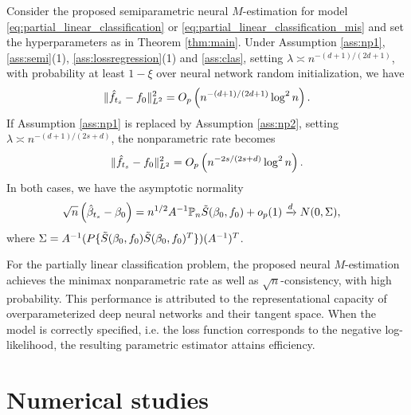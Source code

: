\begin{theorem}\label{cor:classi}
Consider the proposed semiparametric neural $M$-estimation for model \eqref{eq:partial_linear_classification} or \eqref{eq:partial_linear_classification_mis} and set the hyperparameters as in Theorem \ref{thm:main}. Under Assumption \ref{ass:np1}, \ref{ass:semi}(1), \ref{ass:lossregression}(1) and \ref{ass:clas}, 
setting $\lambda \asymp n^{-(d+1)/(2d+1)}$, with probability at least $1-\xi$ over neural network random initialization, 
we have 
$$
\| \hat{f}_{t_{s}} - f_{0} \|_{L^2}^2 = O_p\left( n^{-(d+1)/(2d+1)} \log^2 n \right).
$$
If Assumption \ref{ass:np1} is replaced by Assumption \ref{ass:np2}, setting $\lambda \asymp n^{-(d+1)/(2s+d)}$, the nonparametric rate becomes 
$$
    \| \hat{f}_{t_{s}} - f_{0} \|_{L^2}^2 = O_p\left( n^{-2s/(2s+d)} \log^2 n \right).
$$ 
In both cases, we have the asymptotic normality
\begin{equation}\label{equ:normal2}
\begin{aligned}
&\sqrt{n}\left(\hat{\beta}_{t_{s}}-\beta_{0}\right)=
n^{1/2}  A^{-1}  \mathbb{P}_{n} \tilde{S}(\beta_{0}, f_{0}) +o_p(1) 
\xrightarrow{d} N(0, \Sigma), 
\end{aligned}
\end{equation}
where $\Sigma=A^{-1} (P \{ \tilde{S}(\beta_{0}, f_{0})\tilde{S}(\beta_{0}, f_{0})^{T} \}) (A^{-1})^T $. 
\end{theorem}


For the partially linear classification problem, the proposed neural $M$-estimation achieves the minimax nonparametric rate as well as $\sqrt{n}$-consistency, with high probability. This performance is attributed to the representational capacity of overparameterized deep neural networks and their tangent space. When the model is correctly specified, i.e. the loss function corresponds to the negative log-likelihood, the resulting parametric estimator attains efficiency.











\section{Numerical studies} \label{sec:num}

